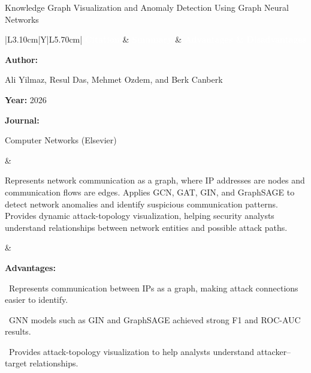 \documentclass[aspectratio=169,10pt]{beamer}
\newcommand{\lrhdr}{%
  \rowcolor{prismNavy}%
  {\scriptsize\textcolor{white}{\textbf{Citation}}} &
  {\scriptsize\textcolor{white}{\textbf{Summary}}} &
  {\scriptsize\textcolor{white}{\textbf{Advantages \& Disadvantages}}} \\}
\begin{document}
\begin{frame}[t]{Knowledge Graph Visualization and Anomaly Detection Using Graph Neural Networks}
\vspace{-0.30em}
{\footnotesize\setlength{\tabcolsep}{3.5pt}\renewcommand{\arraystretch}{1.10}
\begin{tabularx}{\textwidth}{|L{3.10cm}|Y|L{5.70cm}|}
\hline\lrhdr\hline
\begin{minipage}[t]{\linewidth}\fontsize{7.2pt}{9.2pt}\raggedright\selectfont
\textbf{Author:}\par
Ali Yilmaz, Resul Das, Mehmet Ozdem, and Berk Canberk\par\vspace{4pt}
\textbf{Year:} 2026\par\vspace{4pt}
\textbf{Journal:}\par
Computer Networks (Elsevier)\par\vspace{4pt}
\end{minipage}
&
\begin{minipage}[t]{\linewidth}\fontsize{7.1pt}{9.1pt}\raggedright\selectfont
Represents network communication as a graph, where IP addresses are nodes and communication flows are edges. Applies GCN, GAT, GIN, and GraphSAGE to detect network anomalies and identify suspicious communication patterns. Provides dynamic attack-topology visualization, helping security analysts understand relationships between network entities and possible attack paths.\par\vspace{4pt}
\end{minipage}
&
\begin{minipage}[t]{\linewidth}\fontsize{6.8pt}{8.4pt}\raggedright\selectfont
\textcolor{strengthGreen}{\textbf{Advantages:}}\par\vspace{1.3pt}
\textbullet~Represents communication between IPs as a graph, making attack connections easier to identify.\par\vspace{1.8pt}\textbullet~GNN models such as GIN and GraphSAGE achieved strong F1 and ROC-AUC results.\par\vspace{1.8pt}\textbullet~Provides attack-topology visualization to help analysts understand attacker--target relationships.\par\vspace{3.2pt}

\end{minipage}
\end{tabularx}}
\end{frame}
\end{document}
